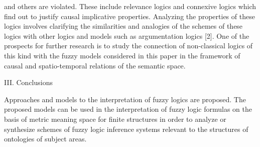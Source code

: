 \documentclass{article}
\begin{document}
\begin{multicols}{2} 
\noindent
\normalsize
and others are violated. These include relevance logics
and connexive logics which find out to justify causal
implicative properties. Analyzing the properties of these
logics involves clarifying the similarities and analogies 
of the schemes of these logics with other logics and
models such as argumentation logics [2]. One of the
prospects for further research is to study the connection
of non-classical logics of this kind with the fuzzy models
considered in this paper in the framework of causal and
spatio-temporal relations of the semantic space.

\begin{center}
\large
III. Conclusions \par
\end{center}
\normalsize

Approaches and models to the interpretation of fuzzy
logics are proposed. The proposed models can be used
in the interpretation of fuzzy logic formulas on the basis
of metric meaning space for finite structures in order to
analyze or synthesize schemes of fuzzy logic inference
systems relevant to the structures of ontologies of subject
areas.


\end{multicols}
\end{document}
